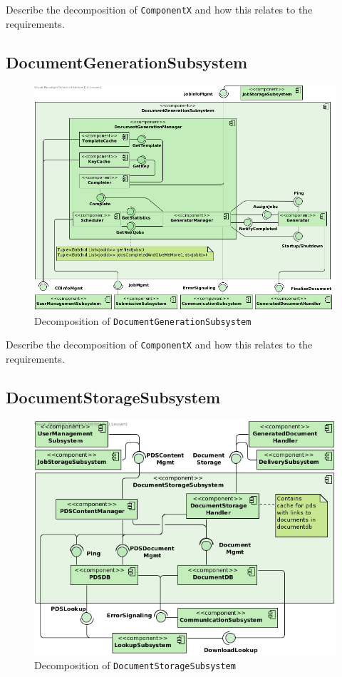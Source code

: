 Describe the decomposition of \texttt{ComponentX} and how this relates to the
requirements.

\subsection{DocumentGenerationSubsystem}
\begin{figure}[!htp]
    \centering
    \includegraphics[width=\textwidth]{figures/Document Generation Subsystem.png}
    \caption{Decomposition of \texttt{DocumentGenerationSubsystem}}\label{fig:decomp-docgensub}
\end{figure}

Describe the decomposition of \texttt{ComponentX} and how this relates to the
requirements.

\subsection{DocumentStorageSubsystem}
\begin{figure}[!htp]
    \centering
    \includegraphics[width=\textwidth]{figures/Document Storage Subsystem.png}
    \caption{Decomposition of \texttt{DocumentStorageSubsystem}}\label{fig:decomp-docstosub}
\end{figure}

